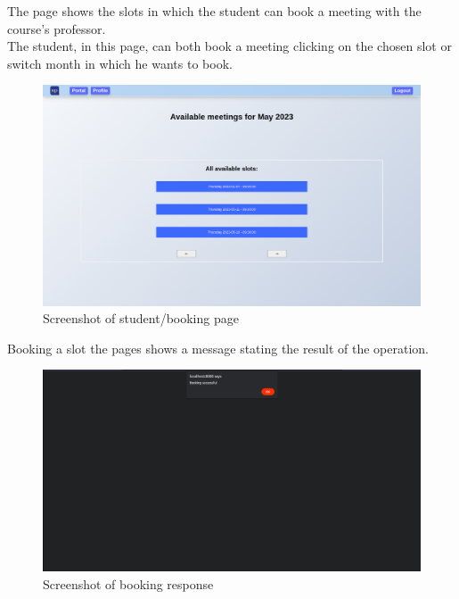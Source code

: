 The page shows the slots in which the student can book a meeting with the course's professor.\\
The student, in this page, can both book a meeting clicking on the chosen slot or switch month in which he wants to book. 
\begin{figure}[H]
    \centering
    \includegraphics[width=\textwidth]{img/user_manual/student/booking.png}
    \caption{Screenshot of student/booking page}
\end{figure}

Booking a slot the pages shows a message stating the result of the operation.
\begin{figure}[H]
    \centering
    \includegraphics[width=\textwidth]{img/user_manual/student/booking-response.png}
    \caption{Screenshot of booking response}
\end{figure}